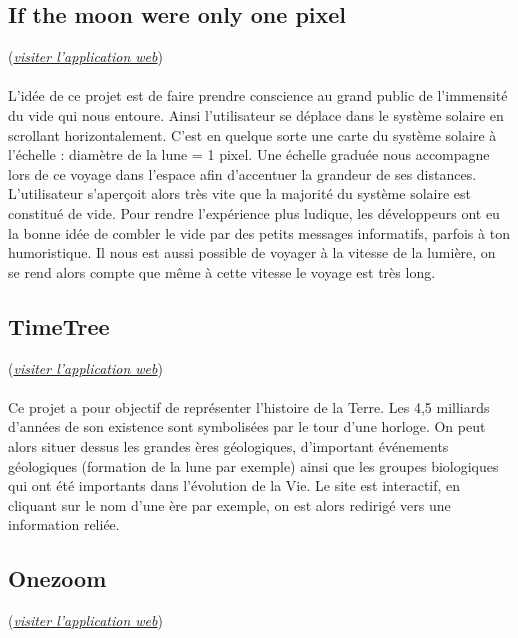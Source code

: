 \documentclass[a4paper]{article}
\begin{document}
	\subsection{If the moon were only one pixel}
	 (\href{http://joshworth.com/dev/pixelspace/pixelspace_solarsystem.html}{\emph{visiter l'application web}}) 
	\paragraph{}
	L’idée de ce projet est de faire prendre conscience au grand public de l'immensité du vide qui nous entoure. Ainsi l'utilisateur se déplace dans le système solaire en scrollant horizontalement. C'est en quelque sorte une carte du système solaire à l'échelle : diamètre de la lune = 1 pixel. Une échelle graduée nous accompagne lors de ce voyage dans l'espace afin d'accentuer la grandeur de ses distances. L'utilisateur s’aperçoit alors très vite que la majorité du système solaire est constitué de vide. Pour rendre l'expérience plus ludique, les développeurs ont eu la bonne idée de combler le vide par des petits messages informatifs, parfois à ton humoristique. Il nous est aussi possible de voyager à la vitesse de la lumière, on se rend alors compte que même à cette vitesse le voyage est très long.         
 		
	\subsection{TimeTree}
	(\href{http://deeptime.info/}{\emph{visiter l'application web}})
	\paragraph{}
	Ce projet a pour objectif de représenter l'histoire de la Terre. Les 4,5 milliards d'années de son existence sont symbolisées par le tour d'une horloge. On peut alors situer dessus les grandes ères géologiques, d'important événements géologiques (formation de la lune par exemple) ainsi que les groupes biologiques qui ont été importants dans l'évolution de la Vie. Le site est interactif, en cliquant sur le nom d'une ère par exemple, on est alors redirigé vers une information reliée.      
	


	\subsection{Onezoom}
	(\href{http://www.onezoom.org/}{\emph{visiter l'application web}})
\end{document}
